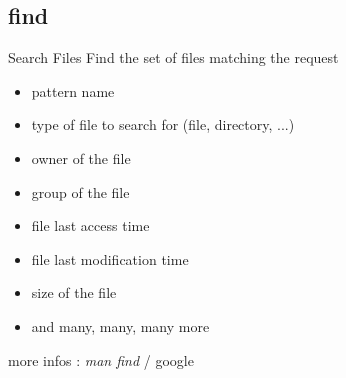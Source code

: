 \subsection{find}
\begin{frame}[fragile]{Search Files}
Find the set of files matching the request
\begin{itemize}
  \pause \item pattern name
  \pause \item type of file to search for (file, directory, ...)
  \pause \item owner of the file
  \pause \item group of the file
  \pause \item file last access time
  \pause \item file last modification time
  \pause \item size of the file
  \pause \item and many, many, many more
\end{itemize}
\pause
more infos : \emph{man find} / google

\end{frame}
